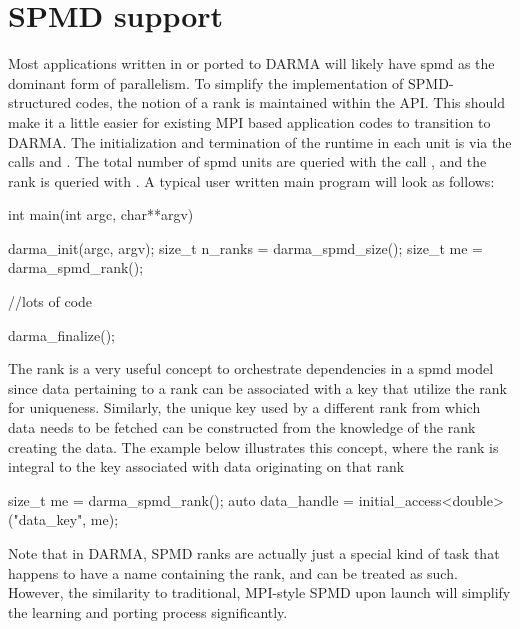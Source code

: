 \section{SPMD support}
\label{sec:spmd}
Most applications written in or ported to DARMA will likely have \gls{spmd} as
the dominant form of parallelism.
To simplify the implementation of SPMD-structured codes, the notion of 
a \gls{rank} is maintained within the \gls{API}.   
This should make it a little easier for existing MPI based application codes to transition 
to DARMA. The initialization and termination of the runtime in each unit 
is via the calls  and . 
The total number of \gls{spmd} units are queried with the call ,
and the rank is queried with . A typical user 
written main program will look as follows:
\begin{CppCode}
int main(int argc, char**argv){

	darma_init(argc, argv);
	size_t n_ranks = darma_spmd_size();
	size_t me = darma_spmd_rank();

	//lots of code

	darma_finalize();
}
\end{CppCode}

The rank is a very useful concept to orchestrate dependencies in a \gls{spmd}
model since data pertaining to a rank can be associated with a key that utilize
the rank for uniqueness. Similarly, the unique key used by a different rank
from which data needs to be fetched can be constructed from the knowledge of
the rank creating the data.  The example below illustrates this concept, where
the rank is integral to the key associated with data originating on that rank
\begin{CppCode}
size_t me = darma_spmd_rank();
auto data_handle = initial_access<double>("data_key", me);
\end{CppCode}  
Note that in DARMA, SPMD ranks are actually just a special kind of task that
happens to have a name containing the rank, and can be treated as such. 
However, the similarity to traditional, MPI-style SPMD upon launch will simplify
the learning and porting process significantly.



